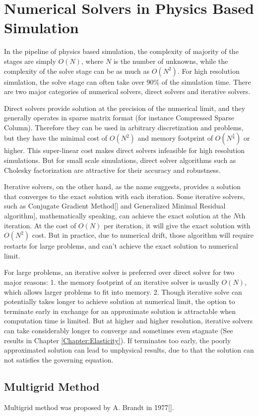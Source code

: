 \chapter{Numerical Solvers in Physics Based Simulation} \label{Chapter:Solver}
In the pipeline of physics based simulation, the complexity of majority of the stages are simply $O(N)$, where $N$ is the number of unknowns, while the complexity of the solve stage can be as much as $O(N^2)$. For high resolution simulation, the solve stage can often take over 90\% of the simulation time. There are two major categories of numerical solvers, direct solvers and iterative solvers. 

Direct solvers provide solution at the precision of the numerical limit, and they generally operates in sparse matrix format (for instance Compressed Sparse Column). Therefore they can be used in arbitrary discretization and problems, but they have the minimal cost of $O(N^2)$ and memory footprint of $O(N^{\frac{4}{3}})$ or higher. This super-linear cost makes direct solvers infeasible for high resolution simulations. But for small scale simulations, direct solver algorithms such as Cholesky factorization are attractive for their accuracy and robustness. 

Iterative solvers, on the other hand, as the name suggests, provides a solution that converges to the exact solution with each iteration. Some iterative solvers, such as Conjugate Gradient Method[\cite{nocedal2006conjugate}] and Generalized Minimal Residual algorithm\cite{saad1986gmres}], mathematically speaking, can achieve the exact solution at the $N$th iteration. At the cost of $O(N)$ per iteration, it will give the exact solution with $O(N^2)$ cost. But in practice, due to numerical drift, those algorithm will require restarts for large problems, and can't achieve the exact solution to numerical limit. 

For large problems, an iterative solver is preferred over direct solver for two major reasons: 1. the memory footprint of an iterative solver is usually $O(N)$, which allows larger problems to fit into memory. 2. Though iterative solve can potentially takes longer to achieve solution at numerical limit, the option to terminate early in exchange for an approximate solution is attractable when computation time is limited. But at higher and higher resolution, iterative solvers can take considerably longer to converge and sometimes even stagnate (See results in Chapter \ref{Chapter:Elasticity}). If terminates too early, the poorly approximated solution can lead to unphysical results, due to that the solution can not satisfies the governing equation.

\section{Multigrid Method}

Multigrid method was proposed by A. Brandt in 1977[\cite{brandt1977multi}].
